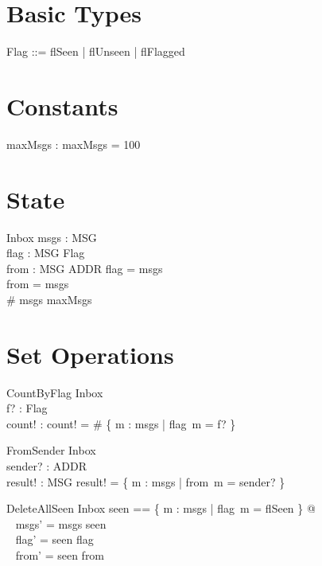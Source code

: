 \documentclass{article}
\begin{document}
\section{Basic Types}

\begin{zed}
\end{zed}

\begin{zed}
  Flag ::= flSeen | flUnseen | flFlagged
\end{zed}

\section{Constants}

\begin{axdef}
  maxMsgs : \nat
\where
  maxMsgs = 100
\end{axdef}

\section{State}

\begin{schema}{Inbox}
  msgs : \power MSG \\
  flag : MSG \pfun Flag \\
  from : MSG \pfun ADDR
\where
  \dom flag = msgs \\
  \dom from = msgs \\
  \# msgs \leq maxMsgs
\end{schema}

\section{Set Operations}

\begin{schema}{CountByFlag}
  \Xi Inbox \\
  f? : Flag \\
  count! : \nat
\where
  count! = \# \{ m : msgs | flag~m = f? \}
\end{schema}

\begin{schema}{FromSender}
  \Xi Inbox \\
  sender? : ADDR \\
  result! : \power MSG
\where
  result! = \{ m : msgs | from~m = sender? \}
\end{schema}

\begin{schema}{DeleteAllSeen}
  \Delta Inbox
\where
  \LET seen == \{ m : msgs | flag~m = flSeen \} @ \\
  \quad~ msgs' = msgs \setminus seen \land \\
  \quad~ flag' = seen \ndres flag \land \\
  \quad~ from' = seen \ndres from
\end{schema}
\end{document}
